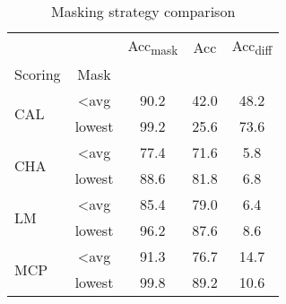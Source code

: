\begin{table}[h]
\centering
\caption{Masking strategy comparison}
\label{tab:mask}
\begin{tabular}{l|c|c|c|c}
 &  & Acc\textsubscript{mask} & Acc & Acc\textsubscript{diff} \\
Scoring & Mask &  &  &  \\
\multirow[c]{2}{*}{CAL} & <avg & 90.2 & 42.0 & 48.2 \\
 & lowest & 99.2 & 25.6 & 73.6 \\
\multirow[c]{2}{*}{CHA} & <avg & 77.4 & 71.6 & 5.8 \\
 & lowest & 88.6 & 81.8 & 6.8 \\
\multirow[c]{2}{*}{LM} & <avg & 85.4 & 79.0 & 6.4 \\
 & lowest & 96.2 & 87.6 & 8.6 \\
\multirow[c]{2}{*}{MCP} & <avg & 91.3 & 76.7 & 14.7 \\
 & lowest & 99.8 & 89.2 & 10.6 \\
\end{tabular}
\end{table}
